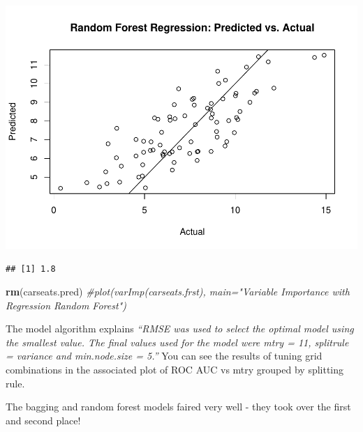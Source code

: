\documentclass[
]{book}
\newenvironment{Shaded}{\begin{snugshade}}{\end{snugshade}}
\newcommand{\CommentTok}[1]{\textcolor[rgb]{0.56,0.35,0.01}{\textit{#1}}}
\newcommand{\DataTypeTok}[1]{\textcolor[rgb]{0.13,0.29,0.53}{#1}}
\newcommand{\KeywordTok}[1]{\textcolor[rgb]{0.13,0.29,0.53}{\textbf{#1}}}
\newcommand{\NormalTok}[1]{#1}
\newcommand{\OperatorTok}[1]{\textcolor[rgb]{0.81,0.36,0.00}{\textbf{#1}}}
\newcommand{\StringTok}[1]{\textcolor[rgb]{0.31,0.60,0.02}{#1}}
\begin{document}
\includegraphics{data-sci_files/figure-latex/unnamed-chunk-118-2.pdf}

\begin{Shaded}
\end{Shaded}

\begin{verbatim}
## [1] 1.8
\end{verbatim}

\begin{Shaded}
\begin{Highlighting}[]
\KeywordTok{rm}\NormalTok{(carseats.pred)}
\CommentTok{#plot(varImp(carseats.frst), main="Variable Importance with Regression Random Forest")}
\end{Highlighting}
\end{Shaded}

The model algorithm explains \emph{``RMSE was used to select the optimal model using the smallest value. The final values used for the model were mtry = 11, splitrule = variance and min.node.size = 5.''} You can see the results of tuning grid combinations in the associated plot of ROC AUC vs mtry grouped by splitting rule.

The bagging and random forest models faired very well - they took over the first and second place!
\end{document}
